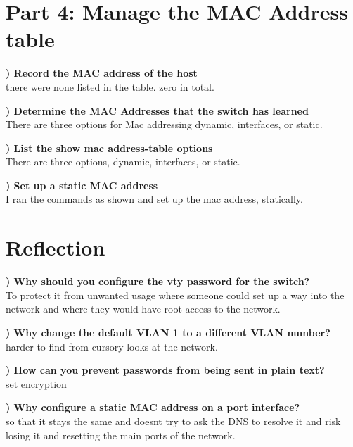 \documentclass{report}
\newcommand{\mysection}[1]{\section*{#1}}
\newcommand{\mysubsection}[2]{\textbf{\romannumeral #1) #2}}
\begin{document}
\clearpage


\mysection{\textbf{Part 4: Manage the MAC Address table}}

\mysubsection{1}{Record the MAC address of the host}
\\there were none listed in the table. zero in total. 
\hfill\break

\noindent\mysubsection{2}{Determine the MAC Addresses that the switch has
learned}
\\There are three options for Mac addressing dynamic, interfaces, or static.
\hfill\break

\noindent\mysubsection{3}{List the show mac address-table options}
\\There are three options, dynamic, interfaces, or static.
\hfill\break

\noindent\mysubsection{4}{Set up a static MAC address}
\\I ran the commands as shown and set up the mac address, statically.
\hfill\break


\mysection{\textbf{Reflection}}
\mysubsection{1}{Why should you configure the vty password for the switch?}
\\To protect it from unwanted usage where someone could set up a way into the
network and where they would have root access to the network.
\hfill\break

\noindent\mysubsection{2}{Why change the default VLAN 1 to a different VLAN
number?}
\\harder to find from cursory looks at the network.
\hfill\break

\noindent\mysubsection{3}{How can you prevent passwords from being sent in
plain text?}
\\set encryption
\hfill\break

\noindent\mysubsection{4}{Why configure a static MAC address on a port
interface?}
\\so that it stays the same and doesnt try to ask the DNS to resolve it and
risk losing it and resetting the main ports of the network.


\end{document}
